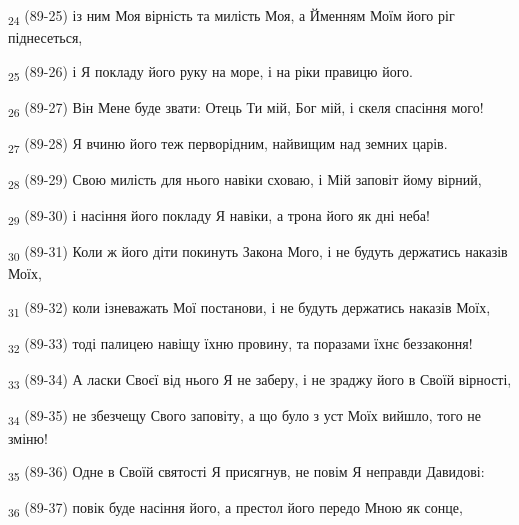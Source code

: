 \begin{tcolorbox}
\textsubscript{24} (89-25) із ним Моя вірність та милість Моя, а Йменням Моїм його ріг піднесеться,
\end{tcolorbox}
\begin{tcolorbox}
\textsubscript{25} (89-26) і Я покладу його руку на море, і на ріки правицю його.
\end{tcolorbox}
\begin{tcolorbox}
\textsubscript{26} (89-27) Він Мене буде звати: Отець Ти мій, Бог мій, і скеля спасіння мого!
\end{tcolorbox}
\begin{tcolorbox}
\textsubscript{27} (89-28) Я вчиню його теж перворідним, найвищим над земних царів.
\end{tcolorbox}
\begin{tcolorbox}
\textsubscript{28} (89-29) Свою милість для нього навіки сховаю, і Мій заповіт йому вірний,
\end{tcolorbox}
\begin{tcolorbox}
\textsubscript{29} (89-30) і насіння його покладу Я навіки, а трона його як дні неба!
\end{tcolorbox}
\begin{tcolorbox}
\textsubscript{30} (89-31) Коли ж його діти покинуть Закона Мого, і не будуть держатись наказів Моїх,
\end{tcolorbox}
\begin{tcolorbox}
\textsubscript{31} (89-32) коли ізневажать Мої постанови, і не будуть держатись наказів Моїх,
\end{tcolorbox}
\begin{tcolorbox}
\textsubscript{32} (89-33) тоді палицею навіщу їхню провину, та поразами їхнє беззаконня!
\end{tcolorbox}
\begin{tcolorbox}
\textsubscript{33} (89-34) А ласки Своєї від нього Я не заберу, і не зраджу його в Своїй вірності,
\end{tcolorbox}
\begin{tcolorbox}
\textsubscript{34} (89-35) не збезчещу Свого заповіту, а що було з уст Моїх вийшло, того не зміню!
\end{tcolorbox}
\begin{tcolorbox}
\textsubscript{35} (89-36) Одне в Своїй святості Я присягнув, не повім Я неправди Давидові:
\end{tcolorbox}
\begin{tcolorbox}
\textsubscript{36} (89-37) повік буде насіння його, а престол його передо Мною як сонце,
\end{tcolorbox}
